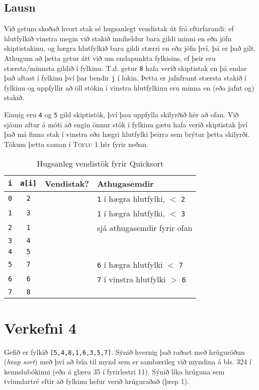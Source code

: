 \documentclass[12pt, a4paper, hidelinks]{article}
\newcommand{\cmark}{\color{Green}\ding{51}}
\newcommand{\xmark}{\color{Red}\ding{55}}
\begin{document}
\subsection*{Lausn}
Við getum skoðað hvort stak sé hugsanlegt vendistak út frá eftirfarandi: ef hlutfylkið vinstra megin við stakið inniheldur bara gildi minni en eða jöfn skiptistakinu,
og hægra hlutfylkið bara gildi stærri en eða jöfn því, þá er það gilt. Athugum að þetta getur átt við um endapunkta fylkisins, ef þeir eru stærsta/minnsta gildið í fylkinu.
T.d. getur \texttt{8} hafa verið skiptistak en þá endar það aftast í fylkinu því þar bendir \texttt{j} í lokin. Þetta er jafnframt stærsta stakið í fylkinu og uppfyllir að
öll stökin í vinstra hlutfylkinu eru minna en (eða jafnt og) stakið.

Einnig eru \texttt{4} og \texttt{5} gild skiptistök, því þau uppfylla skilyrðið hér að ofan. Við sjáum aftur á móti að engin önnur stök í fylkinu gætu hafa verið skiptistak því
það má finna stak í vinstra eða hægri hlutfylki þeirra sem brýtur þetta skilyrði. Tökum þetta saman í \textsc{Töflu} 1 hér fyrir neðan.

\begin{table}[H]
\centering
\begin{tabular}{cccl}
\toprule
  \texttt{i} & \texttt{a[i]} & Vendistak? & Athugasemdir \\
  \midrule
  \texttt{0} & \texttt{2} & \xmark & \texttt{1} í hægra hlutfylki, $<$ \texttt{2} \\
  \texttt{1} & \texttt{3} & \xmark & \texttt{1} í hægra hlutfylki, $<$ \texttt{3} \\
  \texttt{2} & \texttt{1} & \xmark & sjá athugasemdir fyrir ofan \\
  \texttt{3} & \texttt{4} & \cmark & \\
  \texttt{4} & \texttt{5} & \cmark & \\
  \texttt{5} & \texttt{7} & \xmark & \texttt{6} í hægra hlutfylki $<$ \texttt{7} \\
  \texttt{6} & \texttt{6} & \xmark & \texttt{7} í vinstra hlutfylki $>$ \texttt{6} \\
  \texttt{7} & \texttt{8} & \cmark & \\
\bottomrule
\end{tabular}
\caption{Hugsanleg vendistök fyrir Quicksort}
\end{table}

\newpage

\section*{Verkefni 4}
Gefið er fylkið \texttt{[5,4,8,1,6,3,5,7]}. Sýnið hvernig það raðast með hrúguröðun (\emph{heap sort}) með því að búa til mynd
sem er sambærileg við myndina á bls. 324 í kennslubókinni (eða á glæru 35 í fyrirlestri 11). Sýnið líka hrúguna sem tvíundartré eftir að
fylkinu hefur verið hrúguraðað (þrep 1).
\end{document}
